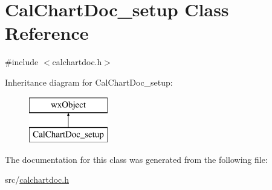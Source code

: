 \hypertarget{a00024}{\section{Cal\-Chart\-Doc\-\_\-setup Class Reference}
\label{a00024}
}


{\ttfamily \#include $<$calchartdoc.\-h$>$}

Inheritance diagram for Cal\-Chart\-Doc\-\_\-setup\-:\begin{figure}[H]
\begin{center}
\leavevmode
\includegraphics[height=2.000000cm]{a00024}
\end{center}
\end{figure}


The documentation for this class was generated from the following file\-:\begin{DoxyCompactItemize}
\item 
src/\hyperlink{a00181}{calchartdoc.\-h}\end{DoxyCompactItemize}
